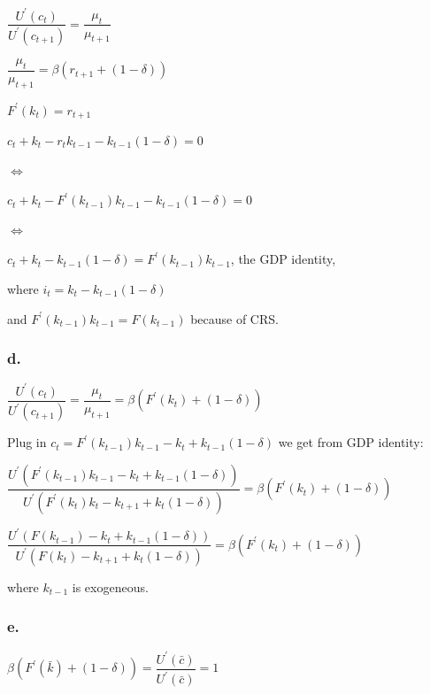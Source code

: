 \documentclass{article}
\begin{document}
$\dfrac{U^{\prime}\left(c_{t}\right)}{U^{\prime}\left(c_{t+1}\right)}=\dfrac{\mu_{t}}{\mu_{t+1}}$

$\dfrac{\mu_{t}}{\mu_{t+1}}=\beta\left(r_{t+1}+\left(1-\delta\right)\right)$

$F^{\prime}\left(k_{t}\right)=r_{t+1}$

$c_{t}+k_{t}-r_{t}k_{t-1}-k_{t-1}\left(1-\delta\right)=0$

$\iff$

$c_{t}+k_{t}-F^{\prime}\left(k_{t-1}\right)k_{t-1}-k_{t-1}\left(1-\delta\right)=0$

$\iff$

$c_{t}+k_{t}-k_{t-1}\left(1-\delta\right)=F^{\prime}\left(k_{t-1}\right)k_{t-1}$, the GDP identity,

where $i_{t}=k_{t}-k_{t-1}\left(1-\delta\right)$

and $F^{\prime}\left(k_{t-1}\right)k_{t-1}=F\left(k_{t-1}\right)$ because of CRS.

\subsubsection*{\textrm{d.}}

$\dfrac{U^{\prime}\left(c_{t}\right)}{U^{\prime}\left(c_{t+1}\right)}=\dfrac{\mu_{t}}{\mu_{t+1}}=\beta\left(F^{\prime}\left(k_{t}\right)+\left(1-\delta\right)\right)$

Plug in $c_{t}=F^{\prime}\left(k_{t-1}\right)k_{t-1}-k_{t}+k_{t-1}\left(1-\delta\right)$ we get from GDP identity:

$\dfrac{U^{\prime}\left(F^{\prime}\left(k_{t-1}\right)k_{t-1}-k_{t}+k_{t-1}\left(1-\delta\right)\right)}{U^{\prime}\left(F^{\prime}\left(k_{t}\right)k_{t}-k_{t+1}+k_{t}\left(1-\delta\right)\right)}=\beta\left(F^{\prime}\left(k_{t}\right)+\left(1-\delta\right)\right)$

$\boxed{\dfrac{U^{\prime}\left(F\left(k_{t-1}\right)-k_{t}+k_{t-1}\left(1-\delta\right)\right)}{U^{\prime}\left(F\left(k_{t}\right)-k_{t+1}+k_{t}\left(1-\delta\right)\right)}=\beta\left(F^{\prime}\left(k_{t}\right)+\left(1-\delta\right)\right)}$

where $k_{t-1}$ is exogeneous.

\subsubsection*{\textrm{e.}}

$\beta\left(F^{\prime}\left(\bar{k}\right)+\left(1-\delta\right)\right)=\dfrac{U^{\prime}\left(\bar{c}\right)}{U^{\prime}\left(\bar{c}\right)}=1$
\end{document}
